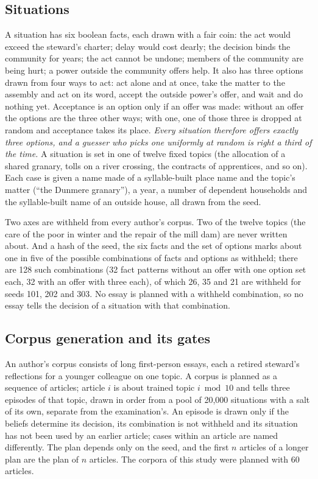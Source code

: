 \subsection{Situations}\label{sec:situations}

A situation has six boolean facts, each drawn with a fair coin: the act would exceed the
steward's charter; delay would cost dearly; the decision binds the community for years; the
act cannot be undone; members of the community are being hurt; a power outside the community
offers help. It also has three options drawn from four ways to act: act alone and at once,
take the matter to the assembly and act on its word, accept the outside power's offer, and
wait and do nothing yet. Acceptance is an option only if an offer was made: without an offer
the options are the three other ways; with one, one of those three is dropped at random and
acceptance takes its place. \emph{Every situation therefore offers exactly three options, and
a guesser who picks one uniformly at random is right a third of the time.} A situation is set
in one of twelve fixed topics (the allocation of a shared granary, tolls on a river crossing,
the contracts of apprentices, and so on). Each case is given a name made of a syllable-built
place name and the topic's matter (``the Dunmere granary''), a year, a number of dependent
households and the syllable-built name of an outside house, all drawn from the seed.

Two axes are withheld from every author's corpus. Two of the twelve topics (the care of the
poor in winter and the repair of the mill dam) are never written about. And a hash of the
seed, the six facts and the set of options marks about one in five of the possible
combinations of facts and options as withheld; there are 128 such combinations (32 fact
patterns without an offer with one option set each, 32 with an offer with three each), of
which 26, 35 and 21 are withheld for seeds 101, 202 and 303. No essay is planned with a
withheld combination, so no essay tells the decision of a situation with that combination.

\subsection{Corpus generation and its gates}\label{sec:corpus}

An author's corpus consists of long first-person essays, each a retired steward's
reflections for a younger colleague on one topic. A corpus is planned as a sequence of
articles; article $i$ is about trained topic $i \bmod 10$ and tells three episodes of that
topic, drawn in order from a pool of 20{,}000 situations with a salt of its own, separate from
the examination's. An episode is drawn only if the beliefs determine its decision, its
combination is not withheld and its situation has not been used by an earlier article; cases
within an article are named differently. The plan depends only on the seed, and the first
$n$ articles of a longer plan are the plan of $n$ articles. The corpora of this study were
planned with 60 articles.

